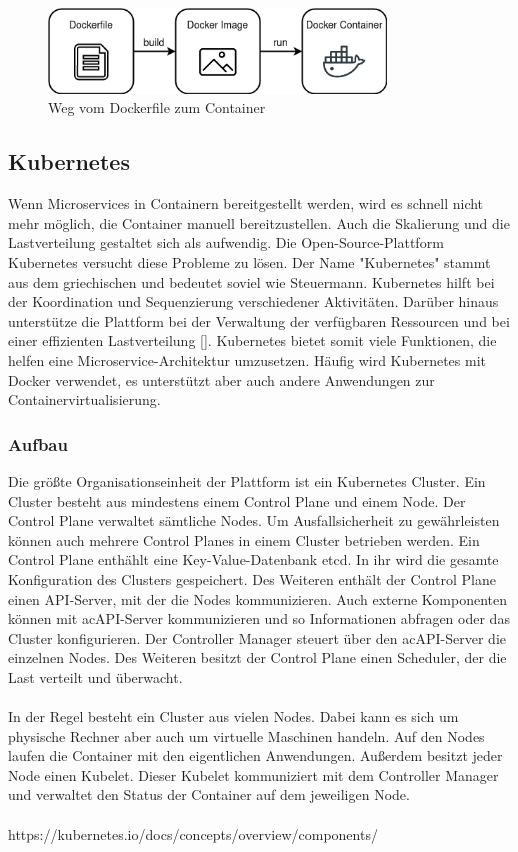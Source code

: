 \begin{figure}[H] 
    \centering
    \includegraphics[width=0.8\textwidth]{figures/DockerFileImageContainer.png}
    \caption{Weg vom Dockerfile zum Container}
\end{figure}

\subsection{Kubernetes}

Wenn Microservices in Containern bereitgestellt werden, wird es schnell nicht mehr möglich, die Container manuell bereitzustellen. Auch die Skalierung und die Lastverteilung gestaltet sich als aufwendig. Die Open-Source-Plattform Kubernetes versucht diese Probleme zu lösen. Der Name "Kubernetes" stammt aus dem griechischen und bedeutet soviel wie Steuermann. Kubernetes hilft bei der Koordination und Sequenzierung verschiedener Aktivitäten. Darüber hinaus unterstütze die Plattform bei der Verwaltung der verfügbaren Ressourcen und bei einer effizienten Lastverteilung [\cite[S. 11]{arundelCloud2019}]. Kubernetes bietet somit viele Funktionen, die helfen eine Microservice-Architektur umzusetzen. Häufig wird Kubernetes mit Docker verwendet, es unterstützt aber auch andere Anwendungen zur Containervirtualisierung.

\subsubsection{Aufbau}

Die größte Organisationseinheit der Plattform ist ein Kubernetes Cluster. Ein Cluster besteht aus mindestens einem Control Plane und einem Node. Der Control Plane verwaltet sämtliche Nodes. Um Ausfallsicherheit zu gewährleisten können auch mehrere Control Planes in einem Cluster betrieben werden. Ein Control Plane enthählt eine Key-Value-Datenbank etcd. In ihr wird die gesamte Konfiguration des Clusters gespeichert. Des Weiteren enthält der Control Plane einen \ac{API}-Server, mit der die Nodes kommunizieren. Auch externe Komponenten können mit ac{API}-Server kommunizieren und so Informationen abfragen oder das Cluster konfigurieren. Der Controller Manager steuert über den ac{API}-Server die einzelnen Nodes. Des Weiteren besitzt der Control Plane einen Scheduler, der die Last verteilt und überwacht.  \\
\\
In der Regel besteht ein Cluster aus vielen Nodes. Dabei kann es sich um physische Rechner aber auch um virtuelle Maschinen handeln. Auf den Nodes laufen die Container mit den eigentlichen Anwendungen. Außerdem besitzt jeder Node einen Kubelet. Dieser Kubelet kommuniziert mit dem Controller Manager und verwaltet den Status der Container auf dem jeweiligen Node. \\
\\
{https://kubernetes.io/docs/concepts/overview/components/}

